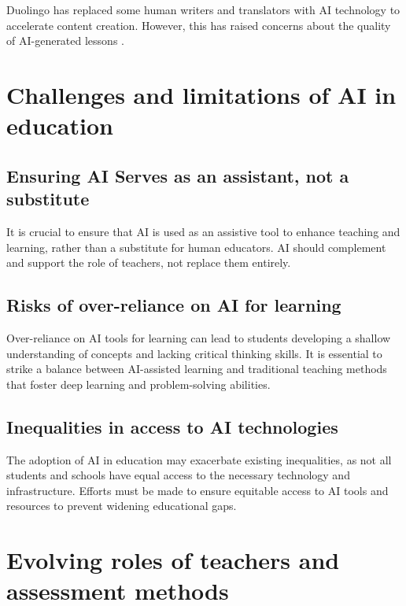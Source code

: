 \documentclass{article}
\begin{document}
Duolingo has replaced some human writers and translators with AI technology to accelerate content creation. However, this has raised concerns about the quality of AI-generated lessons \cite{https://www.baselinemag.com/artificial-intelligence-ai/duolingo-embraces-ai-the-impact-on-language-learning/} \cite{https://www.tomedes.com/translator-hub/ai-revolution-through-duolingo}.












\newpage
\section{Challenges and limitations of AI in education}

\subsection{Ensuring AI Serves as an assistant, not a substitute}
It is crucial to ensure that AI is used as an assistive tool to enhance teaching and learning, rather than a substitute for human educators. AI should complement and support the role of teachers, not replace them entirely.

\subsection{Risks of over-reliance on AI for learning}
Over-reliance on AI tools for learning can lead to students developing a shallow understanding of concepts and lacking critical thinking skills. It is essential to strike a balance between AI-assisted learning and traditional teaching methods that foster deep learning and problem-solving abilities.

\subsection{Inequalities in access to AI technologies}
The adoption of AI in education may exacerbate existing inequalities, as not all students and schools have equal access to the necessary technology and infrastructure. Efforts must be made to ensure equitable access to AI tools and resources to prevent widening educational gaps.

\newpage
\section{Evolving roles of teachers and assessment methods}
\end{document}
